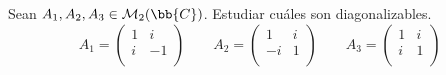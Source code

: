 \begin{ejercicio}
\label{Ejercicio7}
    Sean $A_1, A_2, A_3 \in \mathcal{M}_2(\bb{C})$. Estudiar cuáles son diagonalizables.
    \begin{equation*}
        A_1 = \left( \begin{array}{cc}
            1 & i \\
            i & -1 \\
        \end{array}\right) \qquad
        A_2 = \left( \begin{array}{cc}
            1 & i \\
            -i & 1 \\
        \end{array}\right) \qquad
        A_3 = \left( \begin{array}{cc}
            1 & i \\
            i & 1 \\
        \end{array}\right)
    \end{equation*}


\end{ejercicio}

